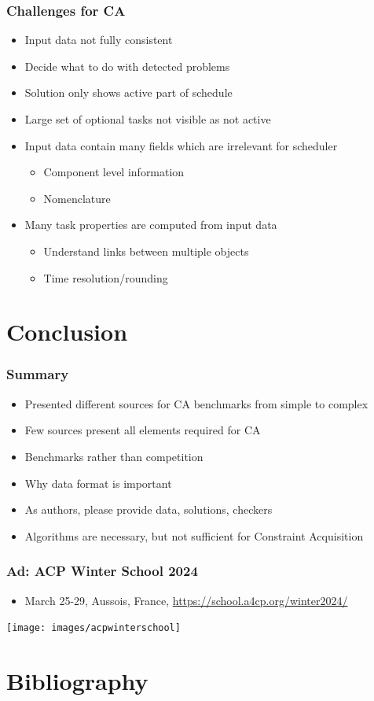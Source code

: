 \documentclass[dvipsnames,aspectratio=169]{beamer}
\begin{document}
\begin{frame}
\frametitle{Challenges for CA}
\begin{itemize}
\item Input data not fully consistent
\item Decide what to do with detected problems
\item Solution only shows active part of schedule
\item Large set of optional tasks not visible as not active
\item Input data contain many fields which are irrelevant for scheduler
\begin{itemize}
\item Component level information
\item Nomenclature
\end{itemize}
\item Many task properties are computed from input data
\begin{itemize}
\item Understand links between multiple objects
\item Time resolution/rounding
\end{itemize}
\end{itemize}
\end{frame}





\section{Conclusion}



\begin{frame}
\frametitle{Summary}
\begin{itemize}
\item Presented different sources for CA benchmarks from simple to complex
\item Few sources present all elements required for CA
\item Benchmarks rather than competition
\item Why data format is important
\item As authors, please provide data, solutions, checkers
\item Algorithms are necessary, but not sufficient for Constraint Acquisition

\end{itemize}
\end{frame}

\begin{frame}
\frametitle{Ad: ACP Winter School 2024}
\begin{itemize}
\item March 25-29, Aussois, France, \url{https://school.a4cp.org/winter2024/} 
\end{itemize}
\texttt{[image: images/acpwinterschool]}
\end{frame}

\section{Bibliography}



\end{document}
